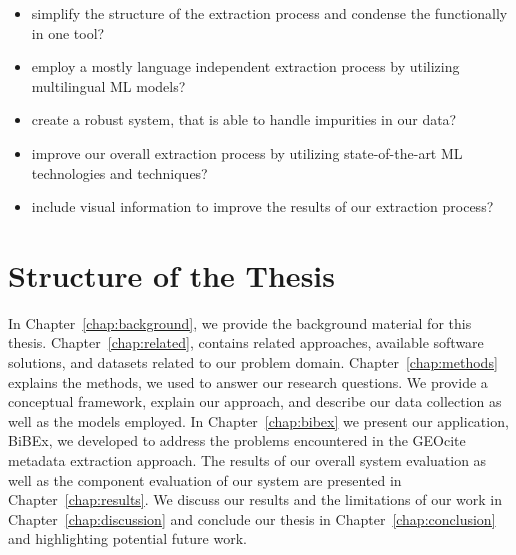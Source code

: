 \begin{itemize}
    \item simplify the structure of the extraction process and condense the functionally in one tool?
    \item employ a mostly language independent extraction process by utilizing multilingual ML models?
    \item create a robust system, that is able to handle impurities in our data?
    \item improve our overall extraction process by utilizing state-of-the-art ML technologies and techniques?
    \item include visual information to improve the results of our extraction process?
\end{itemize}

\section{Structure of the Thesis}\label{sec:structure}
In Chapter~\ref{chap:background}, we provide the background material for this thesis. Chapter~\ref{chap:related}, contains related approaches, available software solutions, and datasets related to our problem domain. Chapter~\ref{chap:methods} explains the methods, we used to answer our research questions. We provide a conceptual framework, explain our approach, and describe our data collection as well as the models employed. In Chapter~\ref{chap:bibex} we present our application, BiBEx, we developed to address the problems encountered in the GEOcite metadata extraction approach. The results of our overall system evaluation as well as the component evaluation of our system are presented in Chapter~\ref{chap:results}. We discuss our results and the limitations of our work in Chapter~\ref{chap:discussion} and conclude our thesis in Chapter~\ref{chap:conclusion} and highlighting potential future work.
